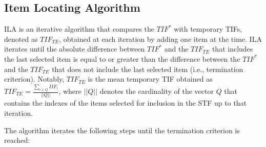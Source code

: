 \documentclass[12pt, a4paper, titilepage]{article}
\begin{document}
\subsection*{Item Locating Algorithm}

ILA is an iterative algorithm that compares the $\mathit{TIF}^*$ with temporary TIFs, denoted as $\mathit{TIF}_{TE}$, obtained at each iteration by adding one item at the time. ILA iterates until  the absolute difference between $\mathit{TIF}^*$ and the $\mathit{TIF}_{TE}$ that includes the last selected item is equal to or greater than the difference between the $\mathit{TIF}^*$ and the $\mathit{TIF}_{TE}$ that does not include the last selected item (i.e., termination criterion). Notably, $\mathit{TIF}_{TE}$  is the mean temporary TIF obtained as $TIF_{TE} = \frac{\sum_{i\in Q} IIF_i}{||Q||}$, where $||Q||$ denotes the cardinality of the vector $Q$ that contains the indexes of the items selected for inclusion in the STF up to that iteration. 







The algorithm iterates the following steps until the termination criterion is reached: 
\end{document}
